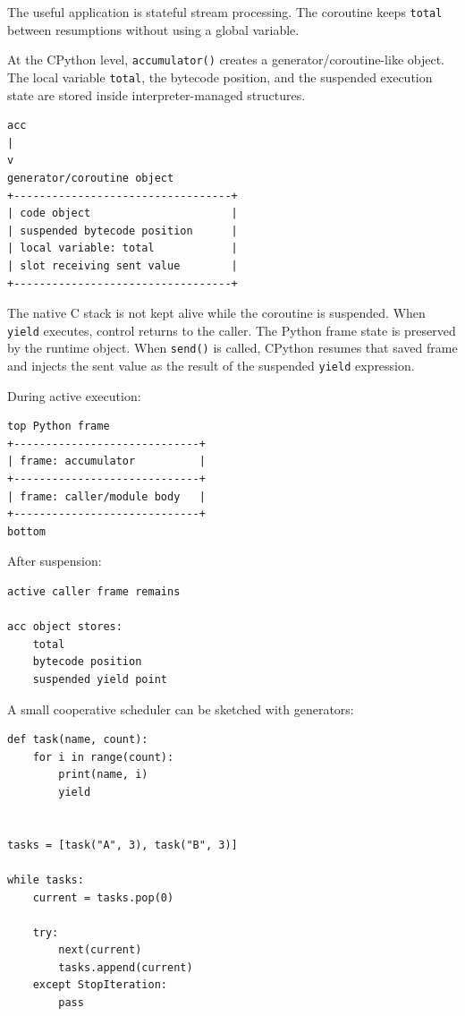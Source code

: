The useful application is stateful stream processing. The coroutine keeps \texttt{total} between resumptions without using a global variable.

At the CPython level, \texttt{accumulator()} creates a generator/coroutine-like object. The local variable \texttt{total}, the bytecode position, and the suspended execution state are stored inside interpreter-managed structures.

\begin{verbatim}
acc
|
v
generator/coroutine object
+----------------------------------+
| code object                      |
| suspended bytecode position      |
| local variable: total            |
| slot receiving sent value        |
+----------------------------------+
\end{verbatim}

The native C stack is not kept alive while the coroutine is suspended. When \texttt{yield} executes, control returns to the caller. The Python frame state is preserved by the runtime object. When \texttt{send()} is called, CPython resumes that saved frame and injects the sent value as the result of the suspended \texttt{yield} expression.

During active execution:

\begin{verbatim}
top Python frame
+-----------------------------+
| frame: accumulator          |
+-----------------------------+
| frame: caller/module body   |
+-----------------------------+
bottom
\end{verbatim}

After suspension:

\begin{verbatim}
active caller frame remains

acc object stores:
    total
    bytecode position
    suspended yield point
\end{verbatim}

A small cooperative scheduler can be sketched with generators:

\begin{verbatim}
def task(name, count):
    for i in range(count):
        print(name, i)
        yield


tasks = [task("A", 3), task("B", 3)]

while tasks:
    current = tasks.pop(0)

    try:
        next(current)
        tasks.append(current)
    except StopIteration:
        pass
\end{verbatim}

